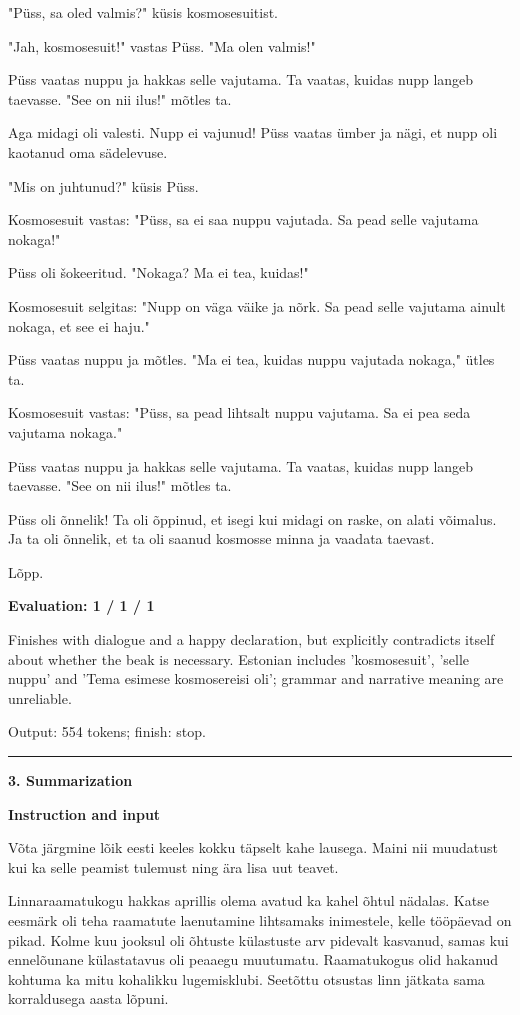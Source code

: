 \documentclass[10pt]{article}
\begin{document}
{\begin{minipage}{\textwidth}
"Püss, sa oled valmis?" küsis kosmosesuitist.
\par\smallskip
"Jah, kosmosesuit!" vastas Püss. "Ma olen valmis!"
\par\smallskip
Püss vaatas nuppu ja hakkas selle vajutama. Ta vaatas, kuidas nupp langeb taevasse. "See on nii ilus!" mõtles ta.
\par\smallskip
Aga midagi oli valesti. Nupp ei vajunud! Püss vaatas ümber ja nägi, et nupp oli kaotanud oma sädelevuse.
\par\smallskip
"Mis on juhtunud?" küsis Püss.
\par\smallskip
Kosmosesuit vastas: "Püss, sa ei saa nuppu vajutada. Sa pead selle vajutama nokaga!"
\par\smallskip
Püss oli šokeeritud. "Nokaga? Ma ei tea, kuidas!"
\par\smallskip
Kosmosesuit selgitas: "Nupp on väga väike ja nõrk. Sa pead selle vajutama ainult nokaga, et see ei haju."
\par\smallskip
Püss vaatas nuppu ja mõtles. "Ma ei tea, kuidas nuppu vajutada nokaga," ütles ta.
\par\smallskip
Kosmosesuit vastas: "Püss, sa pead lihtsalt nuppu vajutama. Sa ei pea seda vajutama nokaga."
\par\smallskip
Püss vaatas nuppu ja hakkas selle vajutama. Ta vaatas, kuidas nupp langeb taevasse. "See on nii ilus!" mõtles ta.
\par\smallskip
Püss oli õnnelik! Ta oli õppinud, et isegi kui midagi on raske, on alati võimalus. Ja ta oli õnnelik, et ta oli saanud kosmosse minna ja vaadata taevast.
\par\smallskip
Lõpp.\par\smallskip
\textbf{Evaluation: 1 / 1 / 1}\par Finishes with dialogue and a happy declaration, but explicitly contradicts itself about whether the beak is necessary. Estonian includes 'kosmosesuit', 'selle nuppu' and 'Tema esimese kosmosereisi oli'; grammar and narrative meaning are unreliable.
\par {\color{gray} Output: 554 tokens; finish: stop.}\par
\medskip\hrule\smallskip
{\bfseries 3. Summarization}\par\smallskip
\textbf{Instruction and input}\par Võta järgmine lõik eesti keeles kokku täpselt kahe lausega. Maini nii muudatust kui ka selle peamist tulemust ning ära lisa uut teavet.
\par\smallskip
Linnaraamatukogu hakkas aprillis olema avatud ka kahel õhtul nädalas. Katse eesmärk oli teha raamatute laenutamine lihtsamaks inimestele, kelle tööpäevad on pikad. Kolme kuu jooksul oli õhtuste külastuste arv pidevalt kasvanud, samas kui ennelõunane külastatavus oli peaaegu muutumatu. Raamatukogus olid hakanud kohtuma ka mitu kohalikku lugemisklubi. Seetõttu otsustas linn jätkata sama korraldusega aasta lõpuni.\par\smallskip

\end{minipage}}
\end{document}
